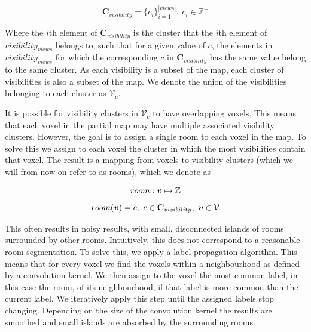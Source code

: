 \begin{equation}
    \label{eq:c_visibility}
    \mathbf{C}_{visibility} = \{c_i\}_{i=1}^{|views|},\ c_i \in \mathbb{Z}^+
\end{equation}

Where the \(i\)th element of \(\mathbf{C}_{visibility}\) is the cluster that the \(i\)th element of \(visibility_{views}\) belongs to, such that for a given value of \(c\), the elements in \(visibility_{views}\) for which the corresponding \(c\) in \(\mathbf{C}_{visibility}\) has the same value belong to the same cluster. As each visibility is a subset of the map, each cluster of visibilities is also a subset of the map. We denote the union of the visibilities belonging to each cluster as \(\mathcal{V}_{c}\). 

It is possible for visibility clusters in \(\mathcal{V}_{c}\) to have overlapping voxels. This means that each voxel in the partial map may have multiple associated visibility clusters. However, the goal is to assign a single room to each voxel in the map. To solve this we assign to each voxel the cluster in which the most visibilities contain that voxel. The result is a mapping from voxels to visibility clusters (which we will from now on refer to as rooms), which we denote as 

\begin{equation}
    \label{eq:room_01}
room: \boldsymbol{v} \mapsto \mathbb{Z}
\end{equation}
\begin{equation}
    \label{eq:room_02}
room(\boldsymbol{v}) = c,\ c \in \mathbf{C}_{visibility},\ \boldsymbol{v} \in \mathcal{V}
\end{equation}

This often results in noisy results, with small, disconnected islands of rooms surrounded by other rooms. Intuitively, this does not correspond to a reasonable room segmentation. To solve this, we apply a label propagation algorithm. This means that for every voxel we find the voxels within a neighbourhood as defined by a convolution kernel. We then assign to the voxel the most common label, in this case the room, of its neighbourhood, if that label is more common than the current label. We iteratively apply this step until the assigned labels stop changing. Depending on the size of the convolution kernel the results are smoothed and small islands are absorbed by the surrounding rooms.


